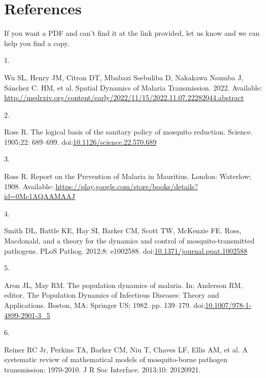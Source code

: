 \documentclass[
]{book}
\newlength{\cslhangindent}
\newlength{\csllabelwidth}
\newlength{\cslentryspacingunit} %
\newenvironment{CSLReferences}[2] %
 {%
  \setlength{\parindent}{0pt}
  \ifodd #1
  \let\oldpar\par
  \def\par{\hangindent=\cslhangindent\oldpar}
  \fi
  \setlength{\parskip}{#2\cslentryspacingunit}
 }%
 {}
\newcommand{\CSLLeftMargin}[1]{\parbox[t]{\csllabelwidth}{#1}}
\newcommand{\CSLRightInline}[1]{\parbox[t]{\linewidth - \csllabelwidth}{#1}\break}
\begin{document}
\hypertarget{references}{%
\chapter{References}\label{references}}

If you want a PDF and can't find it at the link provided, let us know and we can help you find a copy.

\hypertarget{refs}{}
\begin{CSLReferences}{0}{0}
\leavevmode{}%
\CSLLeftMargin{1. }%
\CSLRightInline{Wu SL, Henry JM, Citron DT, Mbabazi Ssebuliba D, Nakakawa Nsumba J, Sánchez C. HM, et al. Spatial {Dynamics} of {Malaria Transmission}. 2022. Available: \url{http://medrxiv.org/content/early/2022/11/15/2022.11.07.22282044.abstract}}

\leavevmode{}%
\CSLLeftMargin{2. }%
\CSLRightInline{Ross R. The logical basis of the sanitary policy of mosquito reduction. Science. 1905;22: 689--699. doi:\href{https://doi.org/10.1126/science.22.570.689}{10.1126/science.22.570.689}}

\leavevmode{}%
\CSLLeftMargin{3. }%
\CSLRightInline{Ross R. Report on the {Prevention} of {Malaria} in {Mauritius}. {London}: {Waterlow}; 1908. Available: \url{https://play.google.com/store/books/details?id=0Mc1AQAAMAAJ}}

\leavevmode{}%
\CSLLeftMargin{4. }%
\CSLRightInline{Smith DL, Battle KE, Hay SI, Barker CM, Scott TW, McKenzie FE. Ross, {Macdonald}, and a theory for the dynamics and control of mosquito-transmitted pathogens. PLoS Pathog. 2012;8: e1002588. doi:\href{https://doi.org/10.1371/journal.ppat.1002588}{10.1371/journal.ppat.1002588}}

\leavevmode{}%
\CSLLeftMargin{5. }%
\CSLRightInline{Aron JL, May RM. The population dynamics of malaria. In: Anderson RM, editor. The {Population Dynamics} of {Infectious Diseases}: {Theory} and {Applications}. {Boston, MA}: {Springer US}; 1982. pp. 139--179. doi:\href{https://doi.org/10.1007/978-1-4899-2901-3_5}{10.1007/978-1-4899-2901-3\_5}}

\leavevmode{}%
\CSLLeftMargin{6. }%
\CSLRightInline{Reiner RC Jr, Perkins TA, Barker CM, Niu T, Chaves LF, Ellis AM, et al. A systematic review of mathematical models of mosquito-borne pathogen transmission: 1970-2010. J R Soc Interface. 2013;10: 20120921. }


\end{CSLReferences}
\end{document}
